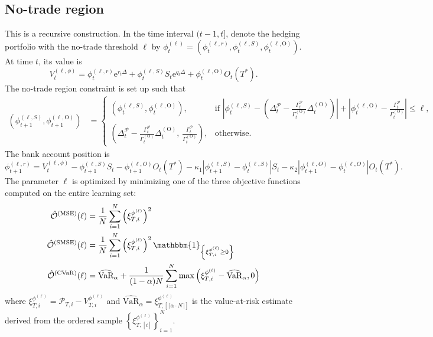 \documentclass[12pt]{article}
\begin{document}
\subsection{No-trade region}\label{appen:delta_gamma no trade region}
This is a recursive construction.  In the time interval $(t-1,t]$, denote the hedging portfolio with the no-trade threshold $\ell$ by $\phi_{t}^{(\ell)} = \left(\phi^{(\ell,r)}_{t}, \phi^{(\ell,S)}_{t}, \phi^{(\ell,\text{O})}_{t}\right)$. At time $t$, its value is  
\begin{equation*}
    V^{(\ell,\phi)}_{t}=\phi^{(\ell,r)}_{t} \text{e}^{r_{t} \Delta} + \phi^{(\ell,S)}_{t} S_{t} \text{e}^{q_{t} \Delta} + \phi^{(\ell,\text{O})}_{t} O_{t}\left( T^*\right).
\end{equation*}
The no-trade region constraint is set up such that
\begin{align*}
    \left(\phi^{(\ell,S)}_{t+1}, \phi^{(\ell,\text{O})}_{t+1}\right) &= 
    \begin{cases} 
        \left(\phi^{(\ell,S)}_{t}, \phi^{(\ell,\text{O})}_{t}\right) , & \text{if } \left\vert \phi_{t}^{(\ell, S)} - \left( \Delta^{\mathcal{P}}_{t} - \frac{\Gamma^{\mathcal{P}}_{t}}{\Gamma_{t}^{(\text{O})}} \Delta^{(\text{O})}_{t}\right) \right\vert + \left\vert \phi^{(\ell, \text{O})}_{t} - \frac{\Gamma^{\mathcal{P}}_{t}}{\Gamma_{t}^{(\text{O})}} \right\vert \leq \ell, \\[4pt]
        \left(\Delta^{\mathcal{P}}_{t} - \frac{\Gamma^{\mathcal{P}}_{t}}{\Gamma_{t}^{(\text{O})}} \Delta^{(\text{O})}_{t}, \, \frac{\Gamma^{\mathcal{P}}_{t}}{\Gamma_{t}^{(\text{O})}}\right) , & \text{otherwise}.
    \end{cases}
\end{align*}
The bank account position is $$\phi^{(\ell,r)}_{t+1}=V^{(\ell,\phi)}_{t} - \phi^{(\ell,S)}_{t+1} S_{t} - \phi^{(\ell,O)}_{t+1} O_{t}(T^*) -\kappa_1 \left\vert \phi^{(\ell,S)}_{t+1}-\phi^{(\ell,S)}_{t}\right\vert S_{t} -\kappa_2 \left\vert \phi^{(\ell,O)}_{t+1}-\phi^{(\ell,O)}_{t}\right\vert O_{t}(T^*).$$
The parameter $\ell$ is optimized by minimizing one of the three objective functions computed on the entire learning set:
\begin{align*}  
    \Hat{\mathcal{O}}^{\left(\mbox{\scriptsize{MSE}}\right)}(\ell) 
    &= \frac{1}{N}\sum_{i=1}^N \left(\xi_{T,i}^{\phi^{(\ell)}}\right)^2 
    \\    \Hat{\mathcal{O}}^{\left(\mbox{\scriptsize{SMSE}}\right)}(\ell) 
    &= \frac{1}{N}\sum_{i=1}^N \left(\xi_{T,i}^{\phi^{(\ell)}}\right)^2 \mathbbm{1}_{\left\{\xi_{T,i}^{\phi^{(\ell)}} \geq 0 \right\}} 
    \\    \Hat{\mathcal{O}}^{\left(\mbox{\scriptsize{CVaR}}\right)}(\ell) &= \widehat{\mbox{VaR}}_{\alpha} + \frac{1}{(1 - \alpha) N} \sum_{i=1}^N \max\left( \xi_{T,i}^{\phi^{(\ell)}} - \widehat{\mbox{VaR}}_{\alpha}, 0 \right)
\end{align*}
where $\xi_{T,i}^{\phi^{(\ell)}} = \mathcal{P}_{T,i} - V_{T,i}^{\phi^{(\ell)}} $ and $\widehat{\mbox{VaR}}_{\alpha} = \xi_{T, \left[\lceil \alpha \cdot N \rceil \right]}^{\phi^{(\ell)}}$ is the value-at-risk estimate derived from the ordered sample $\left\{ \xi_{T,[i]}^{\phi^{(\ell)}} \right\}_{i=1}^N$.
\end{document}
